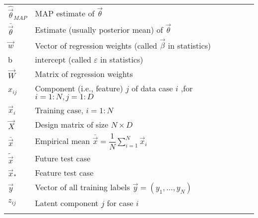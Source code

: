 \begin{longtable}{p{2.4cm}p{8.9cm}}
$\hat{\vec{\theta}}_{MAP}$ & MAP estimate of $\vec{\theta}$\\
$\bar{\vec{\theta}}$ & Estimate (usually posterior mean) of  $\vec{\theta}$\\
$\vec{w}$ & Vector of regression weights (called $\vec{\beta}$ in statistics)\\
b & intercept (called $\varepsilon$ in statistics)\\
$\vec{W}$ & Matrix of regression weights\\
$x_{ij}$ & Component (i.e., feature) $j$ of data case $i$ ,for $i=1:N ,j=1:D$\\
$\vec{x}_i$ & Training case, $i=1:N$\\
$\vec{X}$ & Design matrix of size $N \times D$\\
$\bar{\vec{x}}$ & Empirical mean $\bar{\vec{x}}=\dfrac{1}{N}\sum_{i=1}^{N} \vec{x}_i$\\
$\tilde{\vec{x}}$ & Future test case\\
$\vec{x}_*$ & Feature test case\\
$\vec{y}$ & Vector of all training labels $\vec{y} =(y_1,...,y_N)$\\
$z_{ij}$ & Latent component $j$ for case $i$\\
\noalign{\smallskip}\hline\noalign{\smallskip}
\end{longtable}